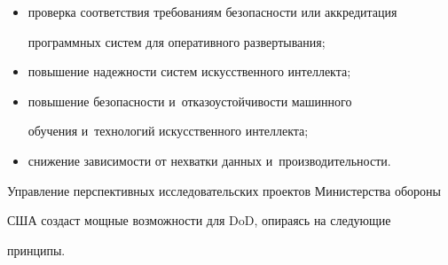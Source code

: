   \begin{itemize}


\item проверка соответствия требованиям безопас\-ности или аккредитация


программных систем для оперативного развертывания;


\item повышение на\-деж\-ности сис\-тем искусственного интеллекта;


\item повышение безопас\-ности и~отказоустойчивости машинного


обучения и~технологий искусственного интеллекта;


\item снижение зависимости от нехватки данных и~производительности.


  \end{itemize}





 Управление перспективных исследовательских проектов Министерства обороны


  США создаст мощные возможности для DoD, опираясь на сле\-ду\-ющие


принципы.


